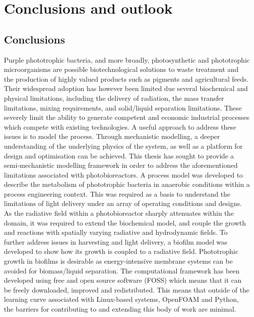 \chapter[Conclusions and outlook]{Conclusions and outlook}
\label{chap:conclusion}

\section{Conclusions}
Purple phototrophic bacteria, and more broadly, photosynthetic and phototrophic microorganisms are possible biotechnological solutions to waste treatment and the production of highly valued products such as pigments and agricultural feeds. Their widespread adoption has however been limited due several biochemical and physical limitations, including the delivery of radiation, the mass transfer limitations, mixing requirements, and solid/liquid separation limitations. These severely limit the ability to generate competent and economic industrial processes which compete with existing technologies. 
\skippingparagraph
A useful approach to address these issues is to model the process. Through mechanistic modelling, a deeper understanding of the underlying physics of the system, as well as a platform for design and optimisation can be achieved. This thesis has sought to provide a semi-mechanistic modelling framework in order to address the aforementioned limitations associated with photobioreactors. A process model was developed to describe the metabolism of phototrophic bacteria in anaerobic conditions within a process engineering context. This was required as a basis to understand the limitations of light delivery under an array of operating conditions and designs. As the radiative field within a photobioreactor sharply attenuates within the domain, it was required to extend the biochemical model, and couple the growth and reactions with spatially varying radiative and hydrodynamic fields. 
To further address issues in harvesting and light delivery, a biofilm model was developed to show how its growth is coupled to a radiative field. Phototrophic growth in biofilms is desirable as energy-intensive membrane systems can be avoided for biomass/liquid separation. The computational framework has been developed using free and open source software (FOSS) which means that it can be freely downloaded, improved and redistributed. This means that outside of the learning curve associated with Linux-based systems, OpenFOAM and Python, the barriers for contributing to and extending this body of work are minimal.


